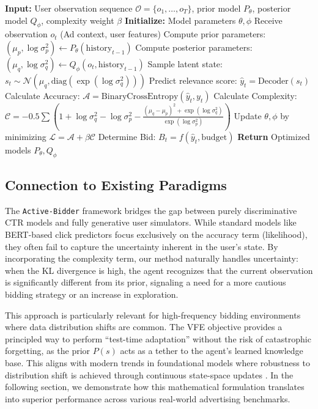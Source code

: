 \begin{algorithm}
\caption{Active-Bidder: Variational Free Energy Minimization}
\begin{algorithmic}[1]
\STATE \textbf{Input:} User observation sequence $\mathcal{O} = \{o_1, \dots, o_T\}$, prior model $P_\theta$, posterior model $Q_\phi$, complexity weight $\beta$
\STATE \textbf{Initialize:} Model parameters $\theta, \phi$
    \STATE Receive observation $o_t$ (Ad context, user features)
    \STATE Compute prior parameters: $(\mu_p, \log\sigma_p^2) \leftarrow P_\theta(\text{history}_{t-1})$
    \STATE Compute posterior parameters: $(\mu_q, \log\sigma_q^2) \leftarrow Q_\phi(o_t, \text{history}_{t-1})$
    \STATE Sample latent state: $s_t \sim \mathcal{N}(\mu_q, \text{diag}(\exp(\log\sigma_q^2)))$
    \STATE Predict relevance score: $\hat{y}_t = \text{Decoder}(s_t)$
    \STATE Calculate Accuracy: $\mathcal{A} = \text{BinaryCrossEntropy}(\hat{y}_t, y_t)$
    \STATE Calculate Complexity: $\mathcal{C} = -0.5 \sum (1 + \log\sigma_q^2 - \log\sigma_p^2 - \frac{(\mu_q - \mu_p)^2 + \exp(\log\sigma_q^2)}{\exp(\log\sigma_p^2)})$
    \STATE Update $\theta, \phi$ by minimizing $\mathcal{L} = \mathcal{A} + \beta \mathcal{C}$
    \STATE Determine Bid: $B_t = f(\hat{y}_t, \text{budget})$
\ENDFOR
\STATE \textbf{Return} Optimized models $P_\theta, Q_\phi$
\end{algorithmic}
\end{algorithm}

\subsection{Connection to Existing Paradigms}

The \texttt{Active-Bidder} framework bridges the gap between purely discriminative CTR models and fully generative user simulators. While standard models like BERT-based click predictors \citep{devlin2018bert} focus exclusively on the accuracy term (likelihood), they often fail to capture the uncertainty inherent in the user's state. By incorporating the complexity term, our method naturally handles uncertainty: when the KL divergence is high, the agent recognizes that the current observation is significantly different from its prior, signaling a need for a more cautious bidding strategy or an increase in exploration.

This approach is particularly relevant for high-frequency bidding environments where data distribution shifts are common. The VFE objective provides a principled way to perform ``test-time adaptation'' without the risk of catastrophic forgetting, as the prior $P(s)$ acts as a tether to the agent's learned knowledge base. This aligns with modern trends in foundational models where robustness to distribution shift is achieved through continuous state-space updates \citep{gu2023mamba}. In the following section, we demonstrate how this mathematical formulation translates into superior performance across various real-world advertising benchmarks.